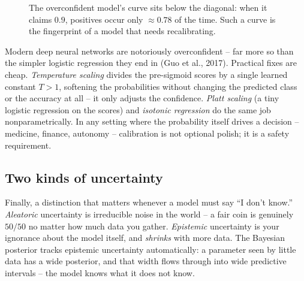 \begin{figure}[H]
\centering
{}
\caption{The overconfident model's curve sits below the diagonal: when it claims
$0.9$, positives occur only $\approx 0.78$ of the time. Such a curve is the
fingerprint of a model that needs recalibrating.}
\label{ch34:fig-calib}
\end{figure}

\begin{applicationbox}
Modern deep neural networks are notoriously overconfident -- far more so than the
simpler logistic regression they end in (Guo et al., 2017). Practical fixes are
cheap. \emph{Temperature scaling} divides the pre-sigmoid scores by a single
learned constant $T>1$, softening the probabilities without changing the
predicted class or the accuracy at all -- it only adjusts the confidence. \emph{Platt
scaling} (a tiny logistic regression on the scores) and \emph{isotonic regression}
do the same job nonparametrically. In any setting where the probability itself
drives a decision -- medicine, finance, autonomy -- calibration is not optional
polish; it is a safety requirement.
\end{applicationbox}

\subsection{Two kinds of uncertainty}

Finally, a distinction that matters whenever a model must say ``I don't know.''
\emph{Aleatoric} uncertainty is irreducible noise in the world -- a fair coin is
genuinely $50/50$ no matter how much data you gather. \emph{Epistemic}
uncertainty is your ignorance about the model itself, and \emph{shrinks} with more
data. The Bayesian posterior tracks epistemic uncertainty automatically: a
parameter seen by little data has a wide posterior, and that width flows through
into wide predictive intervals -- the model knows what it does not know.

